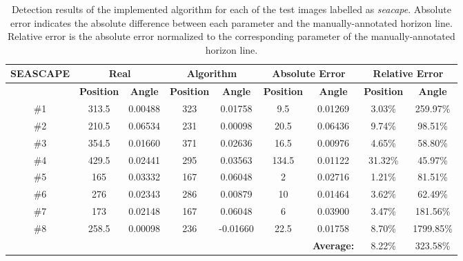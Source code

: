 \begin{table}[htbp]
	\footnotesize
\begin{center}
\begin{tabular}{ccccccccc}
\hline
\textbf{SEASCAPE} & \multicolumn{ 2}{c}{\textbf{Real}} & \multicolumn{ 2}{c}{\textbf{Algorithm}} & \multicolumn{ 2}{c}{\textbf{Absolute Error}} & \multicolumn{ 2}{c}{\textbf{Relative Error}} \\ \hline
 & \textbf{Position} & \textbf{Angle} & \textbf{Position} & \textbf{Angle} & \textbf{Position} & \textbf{Angle} & \textbf{Position} & \textbf{Angle} \\ \hline
\#1 & 313.5 & 0.00488 & 323 & 0.01758 & 9.5 & 0.01269 & 3.03\% & 259.97\% \\ 
\#2 & 210.5 & 0.06534 & 231 & 0.00098 & 20.5 & 0.06436 & 9.74\% & 98.51\% \\ 
\#3 & 354.5 & 0.01660 & 371 & 0.02636 & 16.5 & 0.00976 & 4.65\% & 58.80\% \\ 
\#4 & 429.5 & 0.02441 & 295 & 0.03563 & 134.5 & 0.01122 & 31.32\% & 45.97\% \\ 
\#5 & 165 & 0.03332 & 167 & 0.06048 & 2 & 0.02716 & 1.21\% & 81.51\% \\ 
\#6 & 276 & 0.02343 & 286 & 0.00879 & 10 & 0.01464 & 3.62\% & 62.49\% \\ 
\#7 & 173 & 0.02148 & 167 & 0.06048 & 6 & 0.03900 & 3.47\% & 181.56\% \\ 
\#8 & 258.5 & 0.00098 & 236 & -0.01660 & 22.5 & 0.01758 & 8.70\% & 1799.85\% \\ \hline
\multicolumn{1}{l}{} & \multicolumn{1}{l}{} & \multicolumn{1}{l}{} & \multicolumn{1}{l}{} & \multicolumn{1}{l}{} & \multicolumn{1}{l}{} & \textbf{Average:} & 8.22\% & 323.58\% \\ \hline
\end{tabular}
\end{center}
\caption{Detection results of the implemented algorithm for each of the test images labelled as \emph{seacape}. Absolute error indicates the absolute difference between each parameter and the manually-annotated horizon line. Relative error is the absolute error normalized to the corresponding parameter of the manually-annotated horizon line.}
\label{tab:sea_tab}
\end{table}

